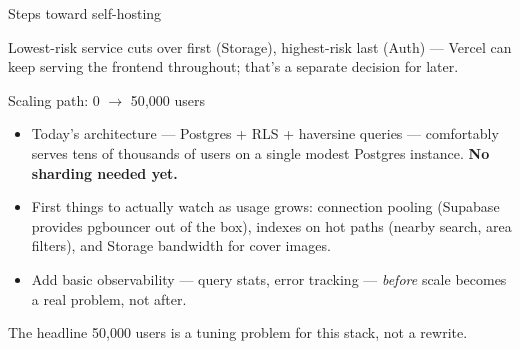 \documentclass[aspectratio=169,11pt]{beamer}
\begin{document}
\begin{frame}{Steps toward self-hosting}
  \begin{center}
  \end{center}
  \vfill
  \small Lowest-risk service cuts over first (Storage), highest-risk last (Auth) --- Vercel can keep serving the frontend throughout; that's a separate decision for later.
\end{frame}

\begin{frame}{Scaling path: 0 $\to$ 50{,}000 users}
  \begin{itemize}
    \item Today's architecture --- Postgres + RLS + haversine queries --- comfortably serves tens of thousands of users on a single modest Postgres instance. \textbf{No sharding needed yet.}
    \item First things to actually watch as usage grows: connection pooling (Supabase provides pgbouncer out of the box), indexes on hot paths (nearby search, area filters), and Storage bandwidth for cover images.
    \item Add basic observability --- query stats, error tracking --- \emph{before} scale becomes a real problem, not after.
  \end{itemize}
  \vfill
  \begin{alertblock}{The headline}
    50{,}000 users is a tuning problem for this stack, not a rewrite.
  \end{alertblock}
\end{frame}
\end{document}
